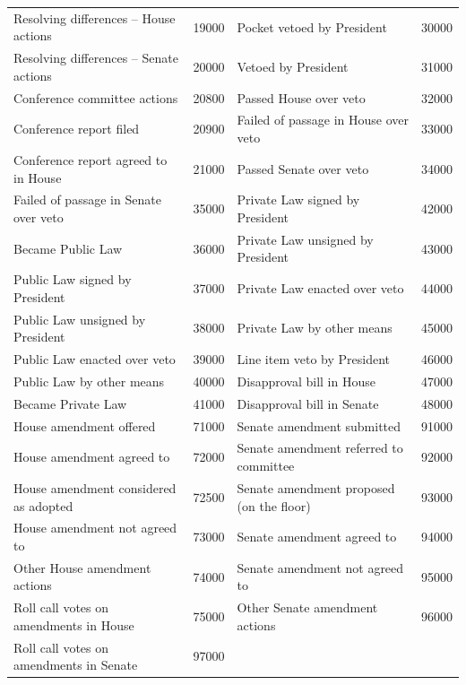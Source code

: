\documentclass[letterpaper,11pt]{article}
\begin{document}
\begin{table}[!h]
\begin{tabular}{llll}
Resolving differences -- House actions & 19000 & Pocket vetoed by President & 30000 \\
Resolving differences -- Senate actions & 20000 & Vetoed by President & 31000 \\
Conference committee actions & 20800 & Passed House over veto & 32000 \\
Conference report filed & 20900 & Failed of passage in House over veto & 33000 \\
Conference report agreed to in House & 21000 & Passed Senate over veto & 34000 \\
Failed of passage in Senate over veto & 35000 & Private Law signed by President & 42000 \\
Became Public Law & 36000 & Private Law unsigned by President & 43000 \\
Public Law signed by President & 37000 & Private Law enacted over veto & 44000 \\
Public Law unsigned by President & 38000 & Private Law by other means & 45000 \\
Public Law enacted over veto & 39000 & Line item veto by President & 46000 \\
Public Law by other means & 40000 & Disapproval bill in House & 47000 \\
Became Private Law & 41000 & Disapproval bill in Senate & 48000 \\
House amendment offered & 71000 & Senate amendment submitted & 91000 \\
House amendment agreed to & 72000 & Senate amendment referred to committee & 92000 \\
House amendment considered as adopted & 72500 & Senate amendment proposed (on the floor) & 93000 \\
House amendment not agreed to & 73000 & Senate amendment agreed to & 94000 \\
Other House amendment actions & 74000 & Senate amendment not agreed to & 95000 \\
Roll call votes on amendments in House & 75000 & Other Senate amendment actions & 96000 \\
Roll call votes on amendments in Senate & 97000 & & \\
\hline
\end{tabular}
\end{table}




\clearpage


\printbibliography
\end{document}
